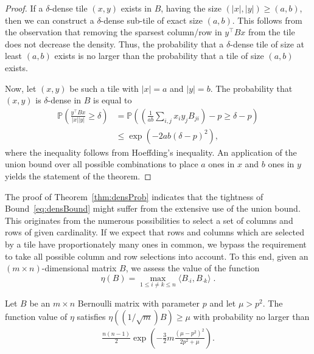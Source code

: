 \begin{proof}
If a $\delta$-dense tile $(x,y)$ exists in $B$, having the size  $(|x|,|y|)\geq (a,b)$, then we can construct a $\delta$-dense sub-tile of exact size $(a,b)$. This follows from the observation that removing the sparsest column/row in $y^\top Bx$ from the tile does not decrease the density. Thus, the probability that a $\delta$-dense tile of size at least $(a,b)$ exists is no larger than the probability that a tile of size $(a,b)$ exists.  

Now, let $(x,y)$ be such a tile with $|x|= a$ and $|y|= b$. The probability that $(x,y)$ is $\delta$-dense in $B$ is equal to
\begin{align*}
\mathbb{P}\left(\frac{y^\top Bx}{|x||y|}\geq \delta\right)
&=\mathbb{P}\left(\left(\frac{1}{ab}\sum_{i,j}x_iy_jB_{ji}\right)-p\geq \delta-p\right)\\
&\leq \exp(-2ab(\delta-p)^2),
\end{align*}
where the inequality follows from Hoeffding's inequality.
An application of the union bound over all possible combinations to place $a$ ones in $x$ and $b$ ones in $y$ yields the statement of the theorem.
\end{proof}
The proof of Theorem~\ref{thm:densProb} indicates that the tightness of Bound~\eqref{eq:densBound} might suffer from the extensive use of the union bound. This originates from the numerous possibilities to select a set of columns and rows of given cardinality. If we expect that rows and columns which are selected by a tile have proportionately many ones in common, we bypass the requirement to take all possible column and row selections into account. To this end, given an $(m\times n)$-dimensional matrix $B$, we assess the value of the function 
\[
\eta(B)= \max_{1\leq i\neq k\leq n} \langle B_{\cdot i},B_{\cdot k}\rangle\;.
\] 
\begin{theorem}
Let $B$ be an $m\times n$ Bernoulli matrix with parameter $p$ and let $\mu>p^2$. The function value of $\eta$ satisfies
$
\eta\left(({1}/\sqrt{m})B\right) \geq \mu
$
with probability no larger than
\begin{align}\label{eq:cohBound}  
\frac{n(n-1)}{2}\exp\left( -\frac{3}{2}m\frac{(\mu-p^2)^2}{2p^2+\mu}\right). 
\end{align}
\end{theorem}
%
